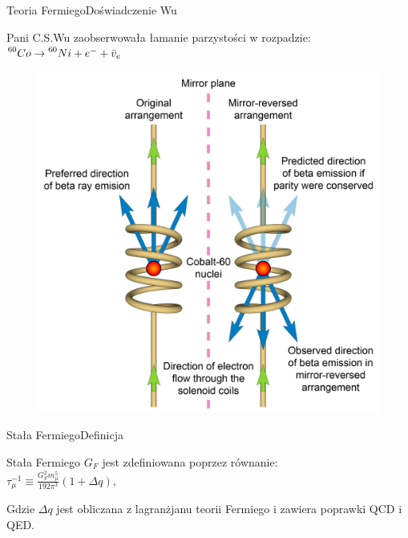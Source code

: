 \documentclass{beamer}
\begin{document}
\begin{frame}{Teoria Fermiego}{Doświadczenie Wu}

Pani C.S.Wu zaobserwowała łamanie parzystości w rozpadzie:\\
\centering
\begin{math}
\prescript{60}{}Co \rightarrow \prescript{60}{}Ni + e^- + \bar{v}_e
\end{math} \cite{wuexp}

\begin{figure}
    \includegraphics[scale=0.06]{Wu_experiment.jpg}
\end{figure}

\end{frame}

\begin{frame}{Stała Fermiego}{Definicja}

        Stała Fermiego $G_F$ jest zdefiniowana poprzez równanie:\\


\centering
\begin{math}
        \tau_\mu^{-1} \equiv \frac{G_F^2 m_\mu^5}{192 \pi^3}(1 + \Delta q),
\end{math}\\


\raggedright
    Gdzie $\Delta q$ jest obliczana z lagranżjanu teorii Fermiego i zawiera poprawki QCD i QED. \cite{strauts}
\end{frame}
\end{document}
